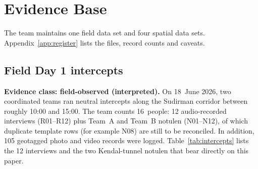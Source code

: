 \documentclass[11pt,a4paper]{article}
\newcommand{\evclass}[2]{\noindent\textcolor{#1}{\small\textbf{Evidence class: #2.}}\enspace}
\begin{document}
\section{Evidence Base}\label{sec:evidence}

The team maintains one field data set and four spatial data sets. Appendix~\ref{app:register} lists
the files, record counts and caveats.

\subsection{Field Day 1 intercepts}\label{sec:field-day}

\evclass{pijakgreen}{field-observed (interpreted)}
On 18~June 2026, two coordinated teams ran neutral intercepts along the Sudirman corridor between
roughly 10:00 and 15:00. The team counts 16~people: 12 audio-recorded interviews (R01--R12) plus
Team~A and Team~B notulen (N01--N12), of which duplicate template rows (for example N08) are still to
be reconciled. In addition, 105 geotagged photo and video records were logged. Table~\ref{tab:intercepts}
lists the 12 interviews and the two Kendal-tunnel notulen that bear directly on this paper.
\end{document}
